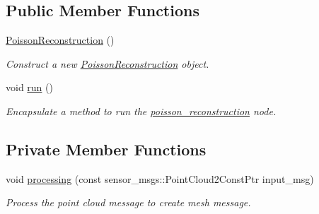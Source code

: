\subsection*{Public Member Functions}
\begin{DoxyCompactItemize}
\item 
\hyperlink{classpoisson__reconstruction_1_1_poisson_reconstruction_a90460dde9c30757ccb95052e65cf58ef}{Poisson\+Reconstruction} ()
\begin{DoxyCompactList}\small\item\em Construct a new \hyperlink{classpoisson__reconstruction_1_1_poisson_reconstruction}{Poisson\+Reconstruction} object. \end{DoxyCompactList}\item 
void \hyperlink{classpoisson__reconstruction_1_1_poisson_reconstruction_aa8ff149207e40459c6443041798df811}{run} ()
\begin{DoxyCompactList}\small\item\em Encapsulate a method to run the \hyperlink{namespacepoisson__reconstruction}{poisson\+\_\+reconstruction} node. \end{DoxyCompactList}\end{DoxyCompactItemize}
\subsection*{Private Member Functions}
\begin{DoxyCompactItemize}
\item 
void \hyperlink{classpoisson__reconstruction_1_1_poisson_reconstruction_a13eaff655ebb89b9e9dfdb56f11fed07}{processing} (const sensor\+\_\+msgs\+::\+Point\+Cloud2\+Const\+Ptr input\+\_\+msg)
\begin{DoxyCompactList}\small\item\em Process the point cloud message to create mesh message. \end{DoxyCompactList}\end{DoxyCompactItemize}
